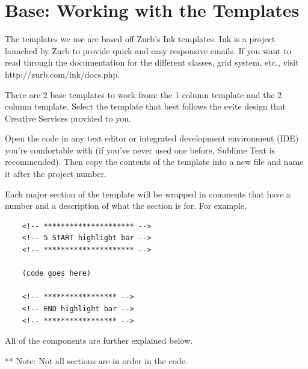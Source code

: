 \documentclass[a4paper,11pt]{article}
\begin{document}
	\section{Base: Working with the Templates}
	The templates we use are based off Zurb's Ink templates. Ink is a project launched by Zurb to provide quick and easy responsive emails. If you want to read through the documentation for the different classes, grid system, etc., visit http://zurb.com/ink/docs.php. \par
	There are 2 base templates to work from: the 1 column template and the 2 column template. Select the template that best follows the evite design that Creative Services provided to you. \par
	Open the code in any text editor or integrated development environment (IDE) you're comfortable with (if you've never used one before, Sublime Text is recommended). Then copy the contents of the template into a new file and name it after the project number.\par 
	
	Each major section of the template will be wrapped in comments that have a number and a description of what the section is for. For example,
	\begin{verbatim}
	<!-- ********************* -->
	<!-- 5 START highlight bar -->
	<!-- ********************* -->
	
	(code goes here)
	
	<!-- ***************** -->
	<!-- END highlight bar -->
	<!-- ***************** -->	
	\end{verbatim}
	All of the components are further explained below.\par
	** Note: Not all sections are in order in the code.\newpage
	
\end{document}
